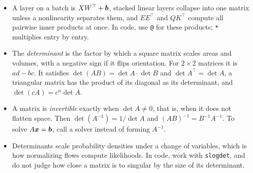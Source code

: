 \begin{itemize}
    in a chain give the same result, but not at the same cost: multiply
    from the side of the vector.
  \item A layer on a batch is $XW^\top + \bm{b}$, stacked linear layers
    collapse into one matrix unless a nonlinearity separates them, and
    $EE^\top$ and $QK^\top$ compute all pairwise inner products at once.
    In code, use \texttt{@} for these products; \texttt{*} multiplies
    entry by entry.
  \item The \emph{determinant} is the factor by which a square matrix
    scales areas and volumes, with a negative sign if it flips
    orientation. For $2 \times 2$ matrices it is $ad - bc$. It satisfies
    $\det(AB) = \det A \cdot \det B$ and $\det A^\top = \det A$, a
    triangular matrix has the product of its diagonal as its determinant,
    and $\det(cA) = c^n \det A$.
  \item A matrix is \emph{invertible} exactly when $\det A \ne 0$, that
    is, when it does not flatten space. Then $\det(A^{-1}) = 1 / \det A$
    and $(AB)^{-1} = B^{-1} A^{-1}$. To solve $A\bm{x} = \bm{b}$, call
    a solver instead of forming $A^{-1}$.
  \item Determinants scale probability densities under a change of
    variables, which is how normalizing flows compute likelihoods. In
    code, work with \texttt{slogdet}, and do not judge how close a matrix
    is to singular by the size of its determinant.
\end{itemize}
